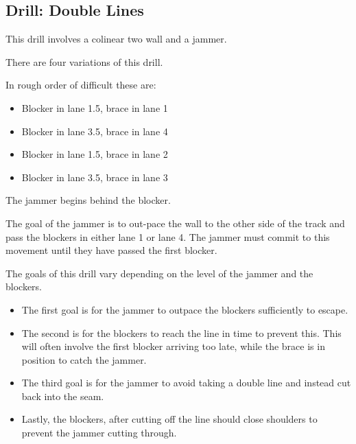 \subsection{Drill: Double Lines}
\label{drill:two_wall/double_lines}
This drill involves a colinear two wall and a jammer.

There are four variations of this drill.

In rough order of difficult these are:
\begin{itemize}
\item Blocker in lane 1.5, brace in lane 1
\item Blocker in lane 3.5, brace in lane 4
\item Blocker in lane 1.5, brace in lane 2
\item Blocker in lane 3.5, brace in lane 3
\end{itemize} 

The jammer begins behind the blocker.

The goal of the jammer is to out-pace the wall to the other side of the track and pass the blockers in either lane 1 or lane 4.
The jammer must commit to this movement until they have passed the first blocker. 


The goals of this drill vary depending on the level of the jammer and the blockers.

\begin{itemize}
\item The first goal is for the jammer to outpace the blockers sufficiently to escape.
\item The second is for the blockers to reach the line in time to prevent this. This will often involve the first blocker arriving too late, while the brace is in position to catch the jammer.
\item The third goal is for the jammer to avoid taking a double line and instead cut back into the seam.
\item Lastly, the blockers, after cutting off the line should close shoulders to prevent the jammer cutting through.
\end{itemize}

